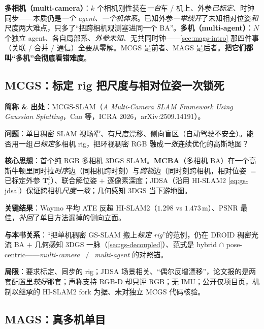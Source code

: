\begin{insight}
\textbf{多相机（multi-camera）}：$k$ 个相机刚性装在\emph{一台}车 / 机上、外参\emph{已标定}、时钟同步——本质仍是\emph{一个 agent、一个机体系}。已知外参\emph{一举绕开}了未知相对位姿\emph{和}尺度两大难点，只多了“把跨相机观测塞进同一个 BA”。\textbf{多机（multi-agent）}：$N$ 个独立 agent、各自局部系、\emph{外参未知}、无共同时钟——\cref{sec:mags-intro} 那四件事（关联 / 合并 / 通信）全要从零解。MCGS 是前者、MAGS 是后者。\textbf{把它们都叫“多机”会彻底看错难度}。
\end{insight}

\subsection{MCGS：标定 rig 把尺度与相对位姿一次锁死}

\begin{paper}
\textbf{简称 \& 出处}：MCGS-SLAM（\emph{A Multi-Camera SLAM Framework Using Gaussian Splatting}，Cao 等，ICRA 2026，arXiv:2509.14191）\cite{cao2026mcgsslam}。

\textbf{问题}：单目稠密 SLAM 视场窄、有尺度漂移、侧向盲区（自动驾驶不安全）。能否用一组\emph{已标定}多相机 rig，把环视稠密 RGB 融成\emph{一张}连续优化的高斯地图？

\textbf{核心思想}：首个纯 RGB 多相机 3DGS SLAM。\textbf{MCBA}（多相机 BA）在一个高斯牛顿里同时拉\emph{时序}边（同相机跨时刻）与\emph{跨视}边（同时刻跨相机，相对位姿 $=$ 已标定外参 $\mathbf T_{c}^{b}$）、联合解位姿 $+$ 逐像素深度；JDSA（沿用 HI-SLAM2 \cref{eq:gs-jdsa}）保证跨相机\emph{尺度一致}；几何感知 3DGS 当下游地图。

\textbf{关键结果}：Waymo 平均 ATE 反超 HI-SLAM2（$1.298$ vs $1.473$\,m）、PSNR 最佳，\emph{补回}了单目方法漏掉的侧向立面。

\textbf{与本书关系}：“把单机稠密 GS-SLAM 搬上\emph{标定 rig}”的范例，仍在 DROID 稠密光流 BA $+$ 几何感知 3DGS 一脉（\cref{sec:gs-decoupled}）、范式是 hybrid $\cap$ pose-centric——\emph{multi-camera $\ne$ multi-agent} 的对照锚。

\textbf{局限}：要求标定、同步的 rig；JDSA 场景相关、“偶尔反增漂移”，论文报的是两套配置里\emph{较好}那套；声称支持 RGB-D 却只评 RGB；无 IMU；公开仅项目页，机制以继承的 HI-SLAM2 fork 为据、未对独立 MCGS 代码核验。
\end{paper}

\subsection{MAGS：真多机单目}

